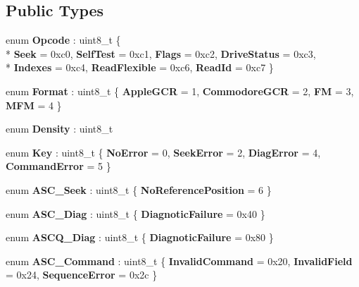 \subsection*{Public Types}
\begin{DoxyCompactItemize}
\item 
\hypertarget{classFC5025_a20c6ea9759857c2a4035ee76812ab68f}{}enum {\bfseries Opcode} \+: uint8\+\_\+t \{ \\*
{\bfseries Seek} = 0xc0, 
{\bfseries Self\+Test} = 0xc1, 
{\bfseries Flags} = 0xc2, 
{\bfseries Drive\+Status} = 0xc3, 
\\*
{\bfseries Indexes} = 0xc4, 
{\bfseries Read\+Flexible} = 0xc6, 
{\bfseries Read\+Id} = 0xc7
 \}\label{classFC5025_a20c6ea9759857c2a4035ee76812ab68f}

\item 
\hypertarget{classFC5025_a5c77c7b92ba3ef9204ce67d76dc62f8c}{}enum {\bfseries Format} \+: uint8\+\_\+t \{ {\bfseries Apple\+G\+C\+R} = 1, 
{\bfseries Commodore\+G\+C\+R} = 2, 
{\bfseries F\+M} = 3, 
{\bfseries M\+F\+M} = 4
 \}\label{classFC5025_a5c77c7b92ba3ef9204ce67d76dc62f8c}

\item 
\hypertarget{classFC5025_af1902ae236f23ab73eb0d64f737b3095}{}enum {\bfseries Density} \+: uint8\+\_\+t \label{classFC5025_af1902ae236f23ab73eb0d64f737b3095}

\item 
\hypertarget{classFC5025_af510c7f00e18b356f791b31be8101a2e}{}enum {\bfseries Key} \+: uint8\+\_\+t \{ {\bfseries No\+Error} = 0, 
{\bfseries Seek\+Error} = 2, 
{\bfseries Diag\+Error} = 4, 
{\bfseries Command\+Error} = 5
 \}\label{classFC5025_af510c7f00e18b356f791b31be8101a2e}

\item 
\hypertarget{classFC5025_aca67e0584955f19ae89c3be0fa2ed562}{}enum {\bfseries A\+S\+C\+\_\+\+Seek} \+: uint8\+\_\+t \{ {\bfseries No\+Reference\+Position} = 6
 \}\label{classFC5025_aca67e0584955f19ae89c3be0fa2ed562}

\item 
\hypertarget{classFC5025_ada53660e7071c46026f58d5bb85fe5d5}{}enum {\bfseries A\+S\+C\+\_\+\+Diag} \+: uint8\+\_\+t \{ {\bfseries Diagnotic\+Failure} = 0x40
 \}\label{classFC5025_ada53660e7071c46026f58d5bb85fe5d5}

\item 
\hypertarget{classFC5025_a2552265feefbe42c9bb4bc8064c440c3}{}enum {\bfseries A\+S\+C\+Q\+\_\+\+Diag} \+: uint8\+\_\+t \{ {\bfseries Diagnotic\+Failure} = 0x80
 \}\label{classFC5025_a2552265feefbe42c9bb4bc8064c440c3}

\item 
\hypertarget{classFC5025_a96c5fbc52b7a2a52e83eb379a1fd28a2}{}enum {\bfseries A\+S\+C\+\_\+\+Command} \+: uint8\+\_\+t \{ {\bfseries Invalid\+Command} = 0x20, 
{\bfseries Invalid\+Field} = 0x24, 
{\bfseries Sequence\+Error} = 0x2c
 \}\label{classFC5025_a96c5fbc52b7a2a52e83eb379a1fd28a2}

\end{DoxyCompactItemize}
